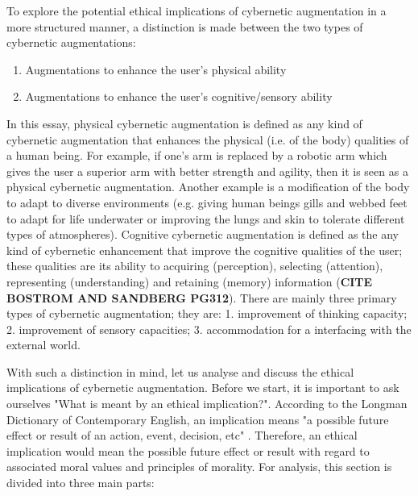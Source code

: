 To explore the potential ethical implications of cybernetic augmentation in a more structured manner, a distinction is made between the two types of cybernetic augmentations: 
\begin{enumerate}
	\item Augmentations to enhance the user's physical ability
	\item Augmentations to enhance the user's cognitive/sensory ability
\end{enumerate}

In this essay, physical cybernetic augmentation is defined as any kind of cybernetic augmentation that enhances the physical (i.e. of the body) qualities of a human being. For example, if one's arm is replaced by a robotic arm which gives the user a superior arm with better strength and agility, then it is seen as a physical cybernetic augmentation. Another example is a modification of the body to adapt to diverse environments (e.g. giving human beings gills and webbed feet to adapt for life underwater or improving the lungs and skin to tolerate different types of atmospheres). Cognitive cybernetic augmentation is defined as the any kind of cybernetic enhancement that improve the cognitive qualities of the user; these qualities are its ability to acquiring (perception), selecting (attention), representing (understanding) and retaining (memory) information ({\bf CITE BOSTROM AND SANDBERG PG312}). There are mainly three primary types of cybernetic augmentation; they are: 1. improvement of thinking capacity; 2. improvement of sensory capacities; 3. accommodation for a interfacing with the external world. 


With such a distinction in mind, let us analyse and discuss the ethical implications of cybernetic augmentation. Before we start, it is important to ask ourselves "What is meant by an ethical implication?". According to the Longman Dictionary of Contemporary English, an implication means "a possible future effect or result of an action, event, decision, etc" \cite{Longman_dic}. Therefore, an ethical implication would mean the possible future effect or result with regard to associated moral values and principles of morality. For analysis, this section is divided into three main parts: 

